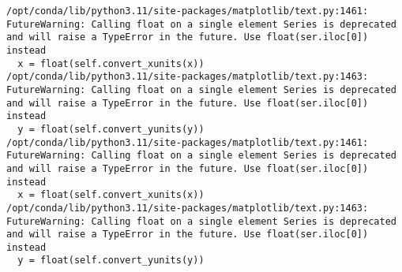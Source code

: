 \documentclass[
  letterpaper,
  DIV=11,
  numbers=noendperiod]{scrreprt}
\newenvironment{Shaded}{\begin{snugshade}}{\end{snugshade}}
\newcommand{\BuiltInTok}[1]{\textcolor[rgb]{0.00,0.23,0.31}{#1}}
\newcommand{\DecValTok}[1]{\textcolor[rgb]{0.68,0.00,0.00}{#1}}
\newcommand{\FloatTok}[1]{\textcolor[rgb]{0.68,0.00,0.00}{#1}}
\newcommand{\NormalTok}[1]{\textcolor[rgb]{0.00,0.23,0.31}{#1}}
\newcommand{\OperatorTok}[1]{\textcolor[rgb]{0.37,0.37,0.37}{#1}}
\newcommand{\StringTok}[1]{\textcolor[rgb]{0.13,0.47,0.30}{#1}}
\newcommand{\VariableTok}[1]{\textcolor[rgb]{0.07,0.07,0.07}{#1}}
\begin{document}
\begin{Shaded}
\end{Shaded}

\begin{verbatim}
/opt/conda/lib/python3.11/site-packages/matplotlib/text.py:1461: FutureWarning: Calling float on a single element Series is deprecated and will raise a TypeError in the future. Use float(ser.iloc[0]) instead
  x = float(self.convert_xunits(x))
/opt/conda/lib/python3.11/site-packages/matplotlib/text.py:1463: FutureWarning: Calling float on a single element Series is deprecated and will raise a TypeError in the future. Use float(ser.iloc[0]) instead
  y = float(self.convert_yunits(y))
/opt/conda/lib/python3.11/site-packages/matplotlib/text.py:1461: FutureWarning: Calling float on a single element Series is deprecated and will raise a TypeError in the future. Use float(ser.iloc[0]) instead
  x = float(self.convert_xunits(x))
/opt/conda/lib/python3.11/site-packages/matplotlib/text.py:1463: FutureWarning: Calling float on a single element Series is deprecated and will raise a TypeError in the future. Use float(ser.iloc[0]) instead
  y = float(self.convert_yunits(y))
\end{verbatim}
\end{document}
